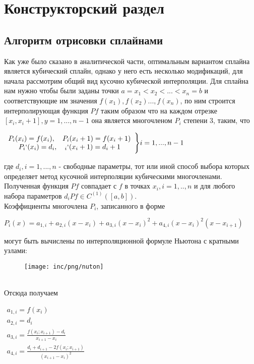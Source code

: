 \chapter{Конструкторский раздел}
\label{cha:impl}

\section{Алгоритм отрисовки сплайнами }
Как уже было сказано в аналитической части, оптимальным вариантом сплайна является кубический сплайн, однако у него есть несколько модификаций, для начала рассмотрим общий вид кусочно кубической интерполяции.\cite{bg98} Для сплайна нам нужно чтобы были заданы точки $a = x_1<x_2<...<x_n=b$ и соответствующие им значения $f(x_1),f(x_2)...,f(x_n)$, по ним строится интерполирующая функция $Pf$ таким образом что на каждом отрезке $[x_i,x_i+1], y=1,...,n-1$ она является многочленом $P_i$ степени 3, таким, что 
\begin{center}
	$\begin{array}{c}
	P_i(x_i)=f(x_i),\quad P_i(x_i+1)=f(x_i+1)\\
	P_i`(x_i)=d_i, \quad_i`(x_i+1)=d_i+1 \\
	\end{array}\Bigg\} i= 1,...,n-1$\\
\end{center}
где $d_i, i=1,...,n$ - свободные параметры, тот или иной способ выбора которых определяет метод кусочной интерполяции кубическими многочленами. Полученная функция $Pf$ совпадает с $f$ в точках $x_i, i=1,..,n$ и для любого набора параметров $d_i Pf \in C^{(1)}([a,b])$.\\
Коэффициенты многочлена $P_i$, записанного в форме
\begin{center}
	$P_i(x)=a_{1,i} + a_{2,i}(x-x_i)+a_{3,i}(x-x_i)^2+a_{4,i}(x-x_i)^2(x-x_{i+1})$
\end{center} 
могут быть вычислены по интерполяционной формуле Ньютона с кратными узлами:
\begin{figure}
	[ht]
	\centering
	\texttt{[image: inc/png/nuton]}
\end{figure} 
\\Отсюда получаем
\begin{center}
	$\begin{array}{l}
	a_{1,i}=f(x_i)\\
	a_{2,i}=d_i\\
	a_{3,i}=\frac{f(x_i;x_{i+1})-d_i}{x_{i+1} - x_i}\\
	a_{4,i}=\frac{d_i +d_{i+1} - 2f(x_i;x_{i+1})}{(x_{i+1}-x_i)^2}\\
	\end{array}$
\end{center}
